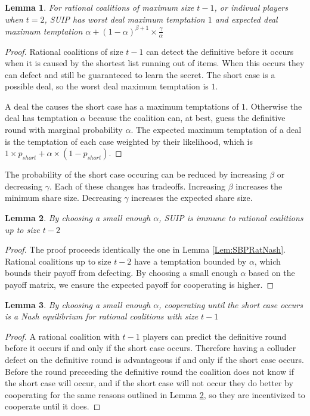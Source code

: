 \documentclass{dalcsthesis}
\newtheorem{lemma}{Lemma}
\begin{document}
\begin{lemma} For rational coalitions of maximum size $t-1$, or indivual players when $t=2$, SUIP has worst deal maximum temptation $1$ and expected deal maximum temptation $\alpha + (1-\alpha)^{\beta+1} \times \frac{\gamma}{\alpha}$ \end{lemma}
\begin{proof}
Rational coalitions of size $t-1$ can detect the definitive before it occurs when it is caused by the shortest list running out of items. When this occurs they can defect and still be guaranteeed to learn the secret. The short case is a possible deal, so the worst deal maximum temptation is $1$.

A deal the causes the short case has a maximum temptations of $1$. Otherwise the deal has temptation $\alpha$ because the coalition can, at best, guess the definitive round with marginal probability $\alpha$. The expected maximum temptation of a deal is the temptation of each case weighted by their likelihood, which is $1 \times p_{short} + \alpha \times (1-p_{short})$.
\end{proof}

The probability of the short case occuring can be reduced by increasing $\beta$ or decreasing $\gamma$. Each of these changes has tradeoffs. Increasing $\beta$ increases the minimum share size. Decreasing $\gamma$ increases the expected share size.

\begin{lemma} By choosing a small enough $\alpha$, SUIP is immune to rational coalitions up to size $t-2$ \label{Lem:SUIP:RatImmLow} \end{lemma}
\begin{proof}
The proof proceeds identically the one in Lemma \ref{Lem:SBPRatNash}. Rational coalitions up to size $t-2$ have a temptation bounded by $\alpha$, which bounds their payoff from defecting. By choosing a small enough $\alpha$ based on the payoff matrix, we ensure the expected payoff for cooperating is higher.
\end{proof}

\begin{lemma} By choosing a small enough $\alpha$, cooperating until the short case occurs is a Nash equilibrium for rational coalitions with size $t-1$ \end{lemma}
\begin{proof}
A rational coalition with $t-1$ players can predict the definitive round before it occurs if and only if the short case occurs. Therefore having a colluder defect on the definitive round is advantageous if and only if the short case occurs. Before the round preceeding the definitive round the coalition does not know if the short case will occur, and if the short case will not occur they do better by cooperating for the same reasons outlined in Lemma \ref{Lem:SUIP:RatImmLow}, so they are incentivized to cooperate until it does.
\end{proof}
\end{document}
